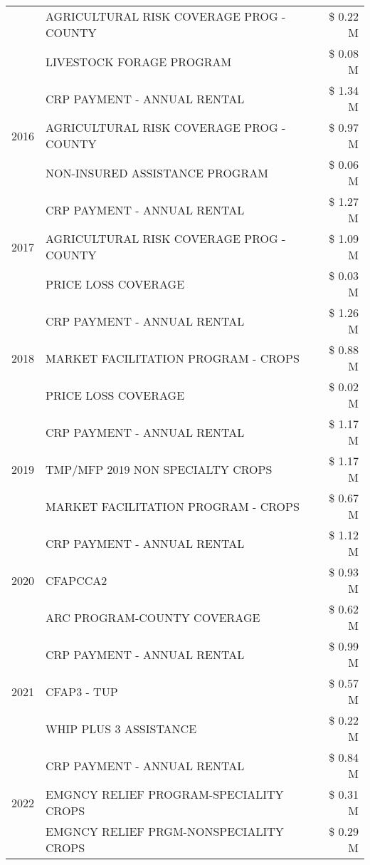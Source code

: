 \begin{tabular}{llr}
 & AGRICULTURAL RISK COVERAGE PROG - COUNTY & \$ 0.22 M \\
 & LIVESTOCK FORAGE PROGRAM & \$ 0.08 M \\
\cline{1-3}
\multirow[t]{3}{*}{2016} & CRP PAYMENT - ANNUAL RENTAL & \$ 1.34 M \\
 & AGRICULTURAL RISK COVERAGE PROG - COUNTY & \$ 0.97 M \\
 & NON-INSURED ASSISTANCE PROGRAM & \$ 0.06 M \\
\cline{1-3}
\multirow[t]{3}{*}{2017} & CRP PAYMENT - ANNUAL RENTAL & \$ 1.27 M \\
 & AGRICULTURAL RISK COVERAGE PROG - COUNTY & \$ 1.09 M \\
 & PRICE LOSS COVERAGE & \$ 0.03 M \\
\cline{1-3}
\multirow[t]{3}{*}{2018} & CRP PAYMENT - ANNUAL RENTAL & \$ 1.26 M \\
 & MARKET FACILITATION PROGRAM - CROPS & \$ 0.88 M \\
 & PRICE LOSS COVERAGE & \$ 0.02 M \\
\cline{1-3}
\multirow[t]{3}{*}{2019} & CRP PAYMENT - ANNUAL RENTAL & \$ 1.17 M \\
 & TMP/MFP 2019 NON SPECIALTY CROPS & \$ 1.17 M \\
 & MARKET FACILITATION PROGRAM - CROPS & \$ 0.67 M \\
\cline{1-3}
\multirow[t]{3}{*}{2020} & CRP PAYMENT - ANNUAL RENTAL & \$ 1.12 M \\
 & CFAPCCA2 & \$ 0.93 M \\
 & ARC PROGRAM-COUNTY COVERAGE & \$ 0.62 M \\
\cline{1-3}
\multirow[t]{3}{*}{2021} & CRP PAYMENT - ANNUAL RENTAL & \$ 0.99 M \\
 & CFAP3 - TUP & \$ 0.57 M \\
 & WHIP PLUS 3 ASSISTANCE & \$ 0.22 M \\
\cline{1-3}
\multirow[t]{3}{*}{2022} & CRP PAYMENT - ANNUAL RENTAL & \$ 0.84 M \\
 & EMGNCY RELIEF PROGRAM-SPECIALITY CROPS & \$ 0.31 M \\
 & EMGNCY RELIEF PRGM-NONSPECIALITY CROPS & \$ 0.29 M \\
\cline{1-3}
\bottomrule
\end{tabular}
